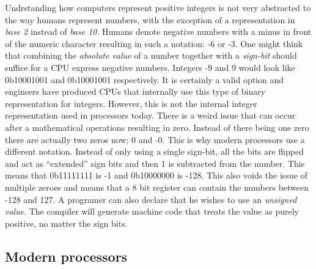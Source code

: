 Undrstanding how computers represent positive integers is not very abstracted to the way humans
represent numbers, with the exception of a representation in \textit{base 2} instead of \textit{base 10}. Humans
denote negative numbers with a minus in front of the numeric character resulting in such a notation: 
-6 or -3. One might think that combining the \textit{absolute value} of a number together with a \textit{sign-bit}
should suffice for a CPU express negative numbers. Integers -9 and 9 would look like 0b10001001 and
0b10001001 respectively. It is certainly a valid option and engineers have produced
CPUs that internally use this type of binary representation for integers. However, this is not the 
internal integer representation used in processors today. There is a weird issue that can occur after
a mathematical operations resulting in zero. Instead of there being one zero there are actually two 
zeros now; 0 and -0. This is why modern processors use a different notation. Instead of only using a
single sign-bit, all the bits are flipped and act as “extended” sign bits and then 1 is subtracted 
from the number. This means that 0b11111111 is -1 and 0b10000000 is -128. This also voids the issue 
of multiple zeroes and means that a 8 bit register can contain the numbers between -128 and 127. 
A programer can also declare that he wishes to use an \textit{unsigned value}. The compiler will generate
machine code that treats the value as purely positive, no matter the sign bits.


\subsection{Modern processors}

